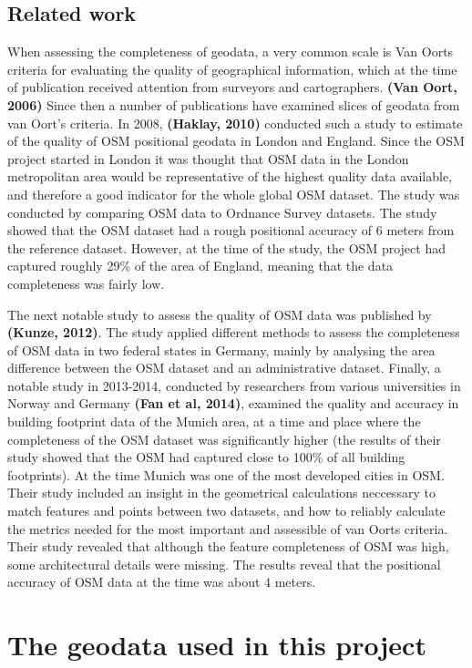 \documentclass{kththesis}
\begin{document}
\section{Related work}
When assessing the completeness of geodata, a very common scale is Van Oorts criteria for evaluating the quality of geographical information, which at the time of publication received attention from surveyors and cartographers.
\textbf{(Van Oort, 2006)} Since then a number of publications have examined slices of geodata from van Oort's criteria.
In 2008, \textbf{(Haklay, 2010)} conducted such a study to estimate of the quality of OSM positional geodata in London and England.
Since the OSM project started in London it was thought that OSM data in the London metropolitan area would be representative of the highest quality data available, and therefore a good indicator for the whole global OSM dataset.
The study was conducted by comparing OSM data to Ordnance Survey datasets.
The study showed that the OSM dataset had a rough positional accuracy of 6 meters from the reference dataset.
However, at the time of the study, the OSM project had captured roughly 29\% of the area of England, meaning that the data completeness was fairly low.

The next notable study to assess the quality of OSM data was published by \textbf{(Kunze, 2012)}.
The study applied different methods to assess the completeness of OSM data in two federal states in Germany, mainly by analysing the area difference between the OSM dataset and an administrative dataset.
Finally, a notable study in 2013-2014, conducted by researchers from various universities in Norway and Germany \textbf{(Fan et al, 2014)}, examined the quality and accuracy in building footprint data of the Munich area, at a time and place where the completeness of the OSM dataset was significantly higher (the results of their study showed that the OSM had captured close to 100\% of all building footprints).
At the time Munich was one of the most developed cities in OSM.
Their study included an insight in the geometrical calculations neccessary to match features and points between two datasets, and how to reliably calculate the metrics needed for the most important and assessible of van Oorts criteria.
Their study revealed that although the feature completeness of OSM was high, some architectural details were missing.
The results reveal that the positional accuracy of OSM data at the time was about 4 meters.

\chapter{The geodata used in this project}
\end{document}
